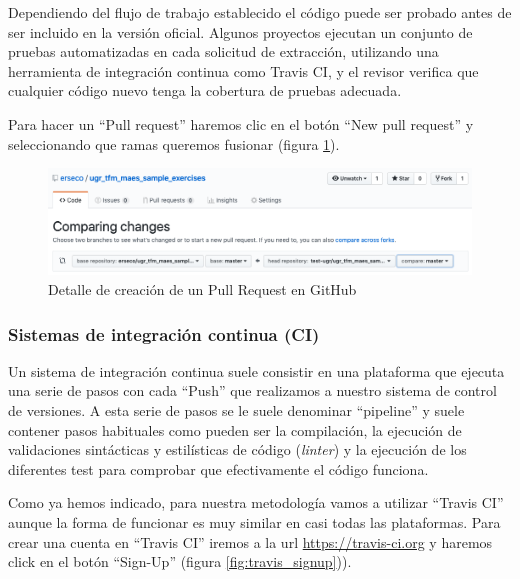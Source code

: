 Dependiendo del flujo de trabajo establecido el código puede ser probado antes de ser incluido en la versión oficial. Algunos proyectos ejecutan un conjunto de pruebas automatizadas en cada solicitud de extracción, utilizando una herramienta de integración continua como Travis CI, y el revisor verifica que cualquier código nuevo tenga la cobertura de pruebas adecuada.

Para hacer un ``Pull request'' haremos clic en el botón ``New pull request'' y seleccionando que ramas queremos fusionar (figura \ref{fig:git_pr}).

\begin{figure}[H]
\centering
\includegraphics[width=1.0\textwidth]{../images/git_pr}
\caption{Detalle de creación de un Pull Request en GitHub}
\label{fig:git_pr}
\end{figure}

\subsubsection{Sistemas de integración continua (CI)}

Un sistema de integración continua suele consistir en una plataforma que ejecuta una serie de pasos con cada ``Push'' que realizamos a nuestro sistema de control de versiones. A esta serie de pasos se le suele denominar ``pipeline'' y suele contener pasos habituales como pueden ser la compilación, la ejecución de validaciones sintácticas y estilísticas de código (\textit{linter}) y la ejecución de los diferentes test para comprobar que efectivamente el código funciona.

\bigskip
Como ya hemos indicado, para nuestra metodología vamos a utilizar ``Travis CI'' aunque la forma de funcionar es muy similar en casi todas las plataformas. Para crear una cuenta en ``Travis CI'' iremos a la url \url{https://travis-ci.org} y haremos click en el botón ``Sign-Up'' (figura \ref{fig:travis_signup})).

